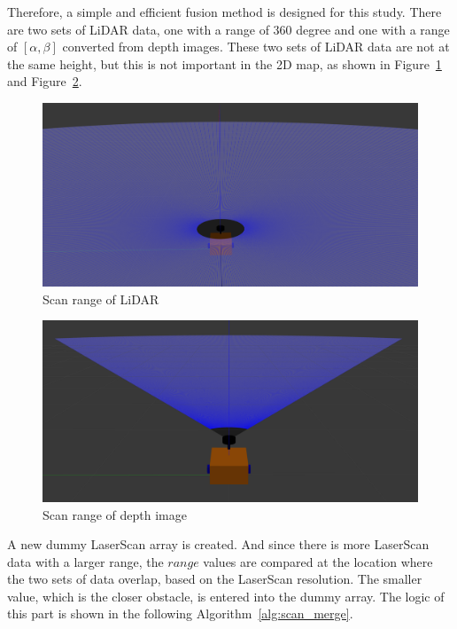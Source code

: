 Therefore, a simple and efficient fusion method is designed for this study. 
There are two sets of LiDAR data, one with a range of 360 degree and one with a range of $[\alpha,\beta]$ converted from depth images. 
These two sets of LiDAR data are not at the same height, but this is not important in the 2D map, as shown in Figure~\ref{fig:lidar_scan} and Figure~\ref{fig:depth_scan}.
\begin{figure}[H]
    \centering
    \includegraphics[width=0.8\linewidth]{figs/lidar_range.png}
    \caption{Scan range of LiDAR}
    \label{fig:lidar_scan}
\end{figure}
\begin{figure}[H]
    \centering
    \includegraphics[width=0.8\linewidth]{figs/depth_range.png}
    \caption{Scan range of depth image}
    \label{fig:depth_scan}
\end{figure}
A new dummy LaserScan array is created. And since there is more LaserScan data with a larger range, 
the $range$ values are compared at the location where the two sets of data overlap, 
based on the LaserScan resolution. The smaller value, which is the closer obstacle, 
is entered into the dummy array. The logic of this part is shown in the following Algorithm~\ref{alg:scan_merge}.

